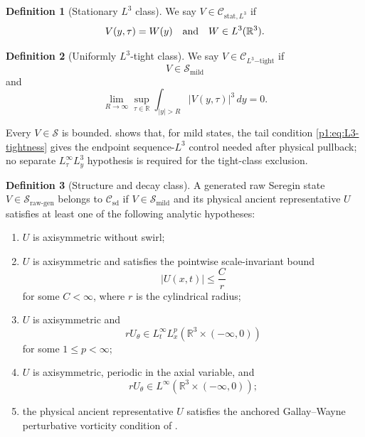 \documentclass[11pt]{amsart}
\theoremstyle{plain}
\theoremstyle{definition}
\newtheorem{definition}[definition]{Definition}
\theoremstyle{remark}
\numberwithin{equation}{section}
\newcommand{\R}{\mathbb R}
\newcommand{\calS}{\mathcal S}
\newcommand{\calC}{\mathcal C}
\begin{document}
\begin{definition}[Stationary \(L^3\) class]\label{p1:def:stationary-class}
We say \(V\in\calC_{\mathrm{stat},L^3}\) if
\[
   V(y,\tau)=W(y)
   \quad\hbox{and}\quad
   W\in L^3(\R^3).
\]
\end{definition}

\begin{definition}[Uniformly \(L^3\)-tight class]\label{p1:def:tight-class}
We say \(V\in\calC_{L^3\mathrm{-tight}}\) if
\[
   V\in\calS_{\mathrm{mild}}
\]
and
\begin{equation}\label{p1:eq:L3-tightness}
   \lim_{R\to\infty}
   \sup_{\tau\in\R}\int_{|y|>R}|V(y,\tau)|^3\,dy=0 .
\end{equation}
\end{definition}

Every \(V\in\calS\) is bounded.   shows that, for
mild states, the tail condition \eqref{p1:eq:L3-tightness} gives the endpoint
sequence-\(L^3\) control needed after physical pullback; no separate
\(L^\infty_\tau L^3_y\) hypothesis is required for the tight-class exclusion.

\begin{definition}[Structure and decay class]
\label{p1:def:known-structure-decay-class}
A generated raw Seregin state \(V\in\calS_{\mathrm{raw\text{-}gen}}\) belongs
to \(\calC_{\mathrm{sd}}\) if \(V\in\calS_{\mathrm{mild}}\) and its physical
ancient representative \(U\) satisfies at least one of the following analytic
hypotheses:
\begin{enumerate}[label=(\roman*)]
\item \(U\) is axisymmetric without swirl;
\item \(U\) is axisymmetric and satisfies the pointwise scale-invariant bound
\[
   |U(x,t)|\le \frac{C}{r}
\]
for some \(C<\infty\), where \(r\) is the cylindrical radius;
\item \(U\) is axisymmetric and
\[
   rU_\theta\in L_t^\infty L_x^p(\R^3\times(-\infty,0))
\]
for some \(1\le p<\infty\);
\item \(U\) is axisymmetric, periodic in the axial variable, and
\[
   rU_\theta\in L^\infty(\R^3\times(-\infty,0));
\]
\item the physical ancient representative \(U\) satisfies the anchored
Gallay--Wayne perturbative vorticity condition of
.
\end{enumerate}
\end{definition}
\end{document}
